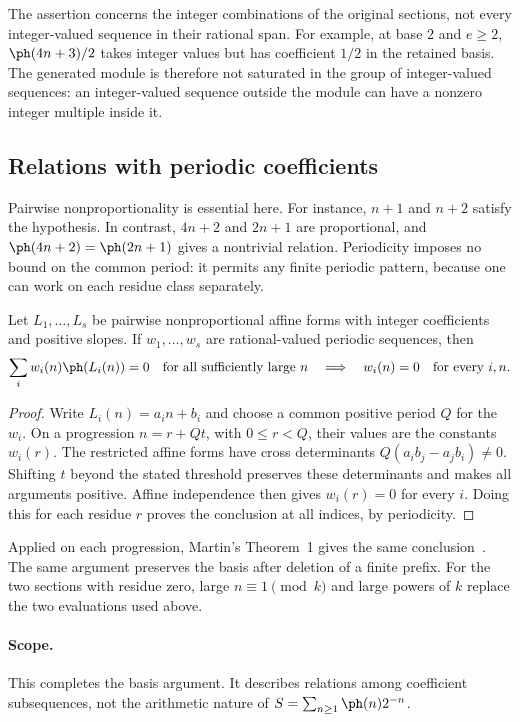 \documentclass[11pt]{article}
\begin{document}
The assertion concerns the integer combinations of the original sections,
not every integer-valued sequence in their rational span. For example,
at base $2$ and $e\ge2$, $\ph(4n+3)/2$ takes integer values but has
coefficient $1/2$ in the retained basis. The generated module is therefore
not saturated in the group of integer-valued sequences: an
integer-valued sequence outside the module can have a nonzero integer
multiple inside it.

\subsection{Relations with periodic coefficients}
Pairwise nonproportionality is essential here. For instance, $n+1$ and
$n+2$ satisfy the hypothesis. In contrast, $4n+2$ and $2n+1$ are
proportional, and $\ph(4n+2)=\ph(2n+1)$ gives a nontrivial relation.
Periodicity imposes no bound on the common period: it permits any finite
periodic pattern, because one can work on each residue class separately.

\begin{corollary}\label{cor:periodic-freezing}
Let $L_1,\ldots,L_s$ be pairwise nonproportional affine forms with integer
coefficients and positive slopes. If $w_1,\ldots,w_s$ are rational-valued
periodic sequences, then
\[
 \sum_i w_i(n)\ph(L_i(n))=0\quad\text{for all sufficiently large }n
 \quad\Longrightarrow\quad w_i(n)=0\quad\text{for every }i,n.
\]
\end{corollary}
\begin{proof}
Write $L_i(n)=a_i n+b_i$ and choose a common positive period $Q$ for
the $w_i$. On a progression $n=r+Qt$, with $0\le r<Q$, their values
are the constants $w_i(r)$. The restricted affine forms have cross
determinants $Q(a_i b_j-a_j b_i)\ne0$. Shifting $t$ beyond the stated
threshold preserves these determinants and makes all arguments
positive. Affine independence then gives $w_i(r)=0$ for every $i$.
Doing this for each residue $r$ proves the conclusion at all indices,
by periodicity.
\end{proof}
Applied on each progression, Martin's Theorem~1 gives the same
conclusion~\cite[Thm.~1]{martin-phi-inequalities}.
The same argument preserves the basis after deletion of a finite prefix.
For the two sections with residue zero, large $n\equiv1\pmod k$ and large powers of $k$
replace the two evaluations used above.
\paragraph{Scope.}
This completes the basis argument. It describes relations among
coefficient subsequences, not the arithmetic nature of
$S=\sum_{n\ge1}\ph(n)2^{-n}$.
\end{document}
